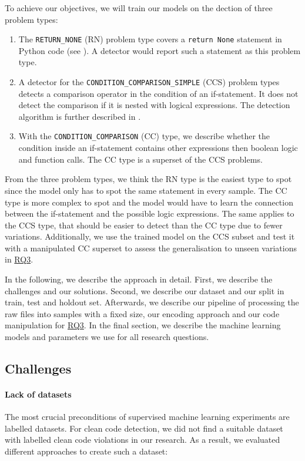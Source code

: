 To achieve our objectives, we will train our models on the dection of three problem types: 
\begin{enumerate}
    \item The \texttt{RETURN\_NONE} (RN) problem type covers a \texttt{return None} statement in Python code (see ). A detector would report such a statement as this problem type.
    \item A detector for the \texttt{CONDITION\_COMPARISON\_SIMPLE} (CCS) problem types detects a comparison operator in the condition of an if-statement. It does not detect the comparison if it is nested with logical expressions. The detection algorithm is further described in .
    \item With the \texttt{CONDITION\_COMPARISON} (CC) type, we describe whether the condition inside an if-statement contains other expressions then boolean logic and function calls. The CC type is a superset of the CCS problems. 
\end{enumerate}
From the three problem types, we think the RN type is the easiest type to spot since the model only has to spot the same statement in every sample. The CC type is more complex to spot and the model would have to learn the connection between the if-statement and the possible logic expressions. The same applies to the CCS type, that should be easier to detect than the CC type due to fewer variations. Additionally, we use the trained model on the CCS subset and test it with a manipulated CC superset to assess the generalisation to unseen variations in \hyperref[rq:3]{RQ3}.

In the following, we describe the approach in detail. First, we describe the challenges and our solutions. Second, we describe our dataset and our split in train, test and holdout set. Afterwards, we describe our pipeline of processing the raw files into samples with a fixed size, our encoding approach and our code manipulation for \hyperref[rq:3]{RQ3}. In the final section, we describe the machine learning models and parameters we use for all research questions.

\subsection{Challenges}
\paragraph{Lack of datasets}
The most crucial preconditions of supervised machine learning experiments are labelled datasets. For clean code detection, we did not find a suitable dataset with labelled clean code violations in our research. 
As a result, we evaluated different approaches to create such a dataset:

